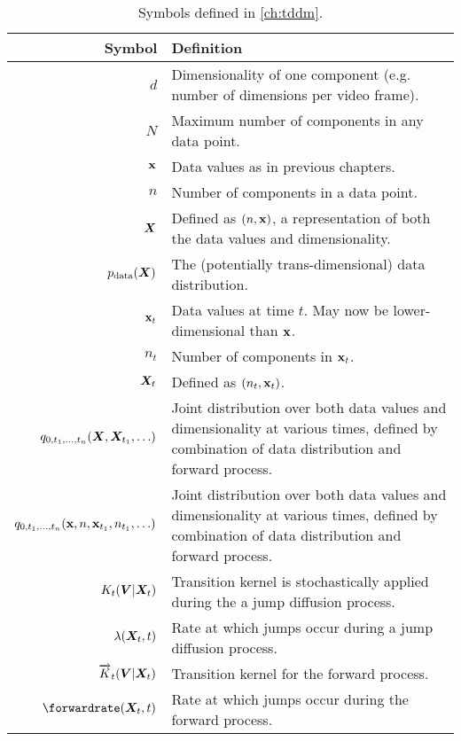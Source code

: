\begin{table*}
  \caption{Symbols defined in \cref{ch:tddm}.}
  \label{tab:notation-appendix-tddm}
  \centering
  \footnotesize
  \begin{tabular}{rp{9cm}}
    \toprule
    Symbol    & Definition   \\
    \midrule
    $d$                                     & Dimensionality of one component (e.g. number of dimensions per video frame). \\
    $N$                                     & Maximum number of components in any data point. \\
    ${\mathbf{x}}$                                  & Data values as in previous chapters. \\
    $n$                                     & Number of components in a data point. \\
    ${\bm{X}}$                                   & Defined as $(n, {\mathbf{x}})$, a representation of both the data values and dimensionality. \\
    $p_{\rm{data}}({\bm{X}})$                                   & The (potentially trans-dimensional) data distribution.  \\
    ${\mathbf{x}}_t$                                & Data values at time $t$. May now be lower-dimensional than ${\mathbf{x}}$. \\
    $n_t$                                   & Number of components in ${\mathbf{x}}_t$. \\
    ${\bm{X}}_t$                                 & Defined as $(n_t, {\mathbf{x}}_t)$. \\
    $q_{0,t_1,\ldots,t_n}({\bm{X}},{\bm{X}}_{t_1},\ldots)$   & Joint distribution over both data values and dimensionality at various times, defined by combination of data distribution and forward process.  \\
    $q_{0,t_1,\ldots,t_n}({\mathbf{x}},n,{\mathbf{x}}_{t_1},n_{t_1},\ldots)$    & Joint distribution over both data values and dimensionality at various times, defined by combination of data distribution and forward process.  \\
    $K_t({\bm{V}} | {\bm{X}}_t)$  & Transition kernel is stochastically applied during the a jump diffusion process. \\
    $ \lambda({\bm{X}}_t, t) $                    &  Rate at which jumps occur during a jump diffusion process.  \\
    $\overrightarrow{K}_t( {\bm{V}} |{\bm{X}}_t)$                    & Transition kernel for the forward process. \\
    $\forwardrate(\mX_t, t)$                 &  Rate at which jumps occur during the forward process.  \\

\end{tabular}
\end{table*}
